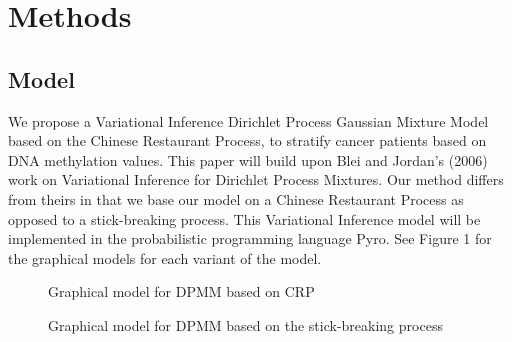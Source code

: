 \documentclass{article}
\begin{document}
\section{Methods}
\label{gen_inst}
\subsection{Model}

We propose a Variational Inference Dirichlet Process Gaussian Mixture Model based on the Chinese Restaurant Process, to stratify cancer patients based on DNA methylation values. This paper will build upon Blei and Jordan's (2006) work on Variational Inference for Dirichlet Process Mixtures. Our method differs from theirs in that we base our model on a Chinese Restaurant Process as opposed to a stick-breaking process. This Variational Inference model will be implemented in the probabilistic programming language Pyro. See Figure 1 for the graphical models for each variant of the model.

\begin{figure}[!htp]
	\centering
	\begin{minipage}{0.45\textwidth}
		\centering
		\caption{Graphical model for DPMM based on CRP}
	\end{minipage}\hfill
	\begin{minipage}{0.45\textwidth}
		\centering
		\vspace{1.2cm}
		\caption{Graphical model for DPMM based on the stick-breaking process}
	\end{minipage}
\end{figure}
\end{document}
